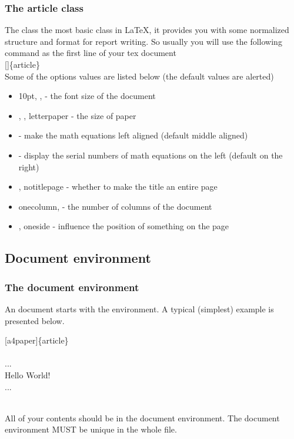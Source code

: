 \begin{frame}
	\frametitle{The article class}
	The  class the most basic class in \LaTeX, it provides you with some normalized structure and format for report writing. So usually you will use the following command as the first line of your tex document\\[0.5em]
	[]\{article\}\\[0.5em]
	Some of the options values are listed below (the default values are \alert{alerted})
	\begin{itemize}
		\item \alert{10pt}, \structure{11pt}, \structure{12pt} - the font size of the document
		\item {}, , \alert{letterpaper} - the size of paper
		\item {} - make the math equations left aligned (default middle aligned)
		\item {} - display the serial numbers of math equations on the left (default on the right)
		\item {}, \alert{notitlepage} - whether to make the title an entire page
		\item \alert{onecolumn},  - the number of columns of the document
		\item {}, \alert{oneside} - influence the position of something on the page
	\end{itemize}
\end{frame}


\subsection{Document environment}

\begin{frame}
	\frametitle{The document environment}
	\begin{definition}
		An document starts with the  environment. A typical  (simplest) example is presented below.
	\end{definition}
	\begin{example}
		[a4paper]\{article\}\\
		\\
		\qquad...\\
		\qquad Hello World!\\
		\qquad...\\
		\\
	\end{example}

	All of your contents should be in the document environment. The document environment \alert{MUST} be \alert{unique} in the whole file.
\end{frame}

